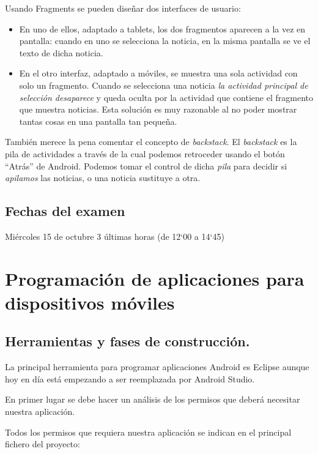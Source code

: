 \documentclass[a4paper,12pt,spanish]{sphinxmanual}
\begin{document}
Usando Fragments se pueden diseñar dos interfaces de usuario:
\begin{itemize}
\item {} 
En uno de ellos, adaptado a tablets, los dos fragmentos aparecen a la vez en pantalla: cuando en uno se selecciona la noticia, en la misma pantalla se ve el texto de dicha noticia.

\item {} 
En el otro interfaz, adaptado a móviles, se muestra una sola actividad con solo un fragmento. Cuando se selecciona una noticia \emph{la actividad principal de selección desaparece} y queda oculta por la actividad que contiene el fragmento que muestra noticias. Esta solución es muy razonable al no poder mostrar tantas cosas en una pantalla tan pequeña.

\end{itemize}

También merece la pena comentar el concepto de \emph{backstack}. El \emph{backstack} es la pila de actividades a través de la cual podemos retroceder usando el botón ``Atrás'' de Android. Podemos tomar el control de dicha \emph{pila} para decidir si \emph{apilamos} las noticias, o una noticia sustituye a otra.


\section{Fechas del examen}
\label{tema1:fechas-del-examen}
Miércoles 15 de octubre 3 últimas horas (de 12`00 a 14`45)


\chapter{Programación de aplicaciones para dispositivos móviles}
\label{tema2::doc}\label{tema2:programacion-de-aplicaciones-para-dispositivos-moviles}

\section{Herramientas y fases de construcción.}
\label{tema2:herramientas-y-fases-de-construccion}
La principal herramienta para programar aplicaciones Android es Eclipse aunque hoy en día está empezando a ser reemplazada por Android Studio.

En primer lugar se debe hacer un análisis de los permisos que deberá necesitar nuestra aplicación.

Todos los permisos que requiera nuestra aplicación se indican en el principal fichero del proyecto: 
\end{document}

